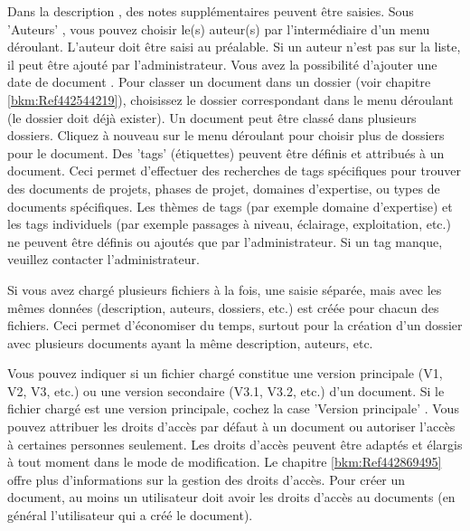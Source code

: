 
Dans la description , des notes supplémentaires peuvent être saisies. Sous 'Auteurs' , vous pouvez choisir le(s) auteur(s) par l'intermédiaire d'un menu déroulant. L'auteur doit être saisi au préalable. Si un auteur n'est pas sur la liste, il peut être ajouté par l'administrateur. Vous avez la possibilité d'ajouter une date de document . Pour classer un document dans un dossier (voir chapitre \ref{bkm:Ref442544219}), choisissez le dossier correspondant dans le menu déroulant  (le dossier doit déjà exister). Un document peut être classé dans plusieurs dossiers. Cliquez à nouveau sur le menu déroulant pour choisir plus de dossiers pour le document. Des 'tags' (étiquettes)  peuvent être définis et attribués à un document. Ceci permet d'effectuer des recherches de tags spécifiques pour trouver des documents de projets, phases de projet, domaines d'expertise, ou types de documents spécifiques. Les thèmes de tags (par exemple domaine d'expertise) et les tags individuels (par exemple passages à niveau, éclairage, exploitation, etc.) ne peuvent être définis ou ajoutés que par l'administrateur. Si un tag manque, veuillez contacter l'administrateur. \newline

Si vous avez chargé plusieurs fichiers à la fois, une saisie séparée, mais avec les mêmes données (description, auteurs, dossiers, etc.) est créée pour chacun des fichiers. Ceci permet d'économiser du temps, surtout pour la création d'un dossier avec plusieurs documents ayant la même description, auteurs, etc. \newline


Vous pouvez indiquer si un fichier chargé constitue une version principale (V1, V2, V3, etc.) ou une version secondaire (V3.1, V3.2, etc.) d'un document. Si le fichier chargé est une version principale, cochez la case 'Version principale' . Vous pouvez attribuer les droits d'accès par défaut  à un document ou autoriser l'accès à certaines personnes seulement. Les droits d'accès peuvent être adaptés et élargis à tout moment dans le mode de modification. Le chapitre \ref{bkm:Ref442869495} offre plus d'informations sur la gestion des droits d'accès. Pour créer un document, au moins un utilisateur doit avoir les droits d'accès au documents (en général l'utilisateur qui a créé le document).

